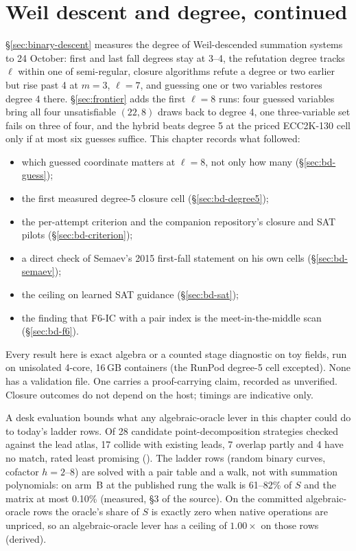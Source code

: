 \chapter{Weil descent and degree, continued}\label{ch:binarydegree}

\S\ref{sec:binary-descent} measures the degree of Weil-descended summation
systems to 24 October: first and last fall degrees stay at 3--4, the
refutation degree tracks $\ell$ within one of semi-regular, closure
algorithms refute a degree or two earlier but rise past 4 at $m=3$,
$\ell=7$, and guessing one or two variables restores degree 4 there.
\S\ref{sec:frontier} adds the first $\ell=8$ runs: four guessed variables
bring all four unsatisfiable $(22,8)$ draws back to degree 4, one
three-variable set fails on three of four, and the hybrid beats degree 5 at
the priced ECC2K-130 cell only if at most six guesses suffice. This chapter
records what followed:
\begin{itemize}
\item which guessed coordinate matters at $\ell=8$, not only how many
  (\S\ref{sec:bd-guess});
\item the first measured degree-5 closure cell (\S\ref{sec:bd-degree5});
\item the per-attempt criterion and the companion repository's closure and
  SAT pilots (\S\ref{sec:bd-criterion});
\item a direct check of Semaev's 2015 first-fall statement on his own cells
  (\S\ref{sec:bd-semaev});
\item the ceiling on learned SAT guidance (\S\ref{sec:bd-sat});
\item the finding that F6-IC with a pair index is the meet-in-the-middle
  scan (\S\ref{sec:bd-f6}).
\end{itemize}
Every result here is exact algebra or a counted stage diagnostic on toy
fields, run on unisolated 4-core, 16\,GB containers (the RunPod degree-5
cell excepted). None has a validation file. One carries a proof-carrying
claim, recorded as unverified. Closure outcomes do not depend on the host;
timings are indicative only.

A desk evaluation bounds what any algebraic-oracle lever in this chapter
could do to today's ladder rows. Of 28 candidate point-decomposition
strategies checked against the lead atlas, 17 collide with existing leads,
7 overlap partly and 4 have no match, rated least promising
(). The ladder rows
(random binary curves, cofactor $h=2$--$8$) are solved with a pair table and
a walk, not with summation polynomials: on arm~B at the published rung the
walk is 61--82\% of $S$ and the matrix at most 0.10\% (measured, \S3 of the
source). On the committed algebraic-oracle rows the oracle's share of $S$ is
exactly zero when native operations are unpriced, so an algebraic-oracle
lever has a ceiling of $1.00\times$ on those rows (derived).

